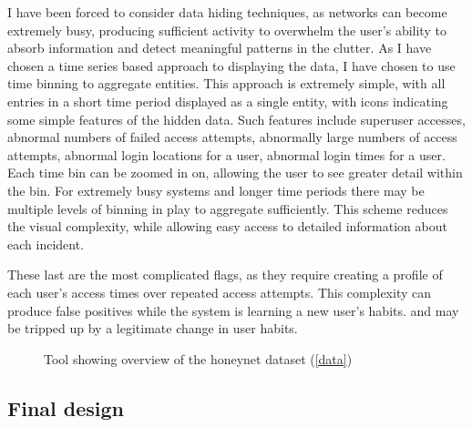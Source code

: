 I have been forced to consider data hiding techniques, as networks can become extremely busy, producing sufficient activity to overwhelm the user's ability to absorb information and detect meaningful patterns in the clutter. As I have chosen a time series based approach to displaying the data, I have chosen to use time binning to aggregate entities. This approach is extremely simple, with all entries in a short time period displayed as a single entity, with icons indicating some simple features of the hidden data. Such features include superuser accesses, abnormal numbers of failed access attempts, abnormally large numbers of access attempts, abnormal login locations for a user, abnormal login times for a user. Each time bin can be zoomed in on, allowing the user to see greater detail within the bin. For extremely busy systems and longer time periods there may be multiple levels of binning in play to aggregate sufficiently. This scheme reduces the visual complexity, while allowing easy access to detailed information about each incident. 

These last are the most complicated flags, as they require creating a profile of each user's access times over repeated access attempts. This complexity can produce false positives while the system is learning a new user's habits. and may be tripped up by a legitimate change in user habits.

\begin{figure}[tbh!]
\caption{\protect\label{overview}Tool showing overview of the honeynet dataset (\ref{data})}
\end{figure}

\subsection {Final design}

